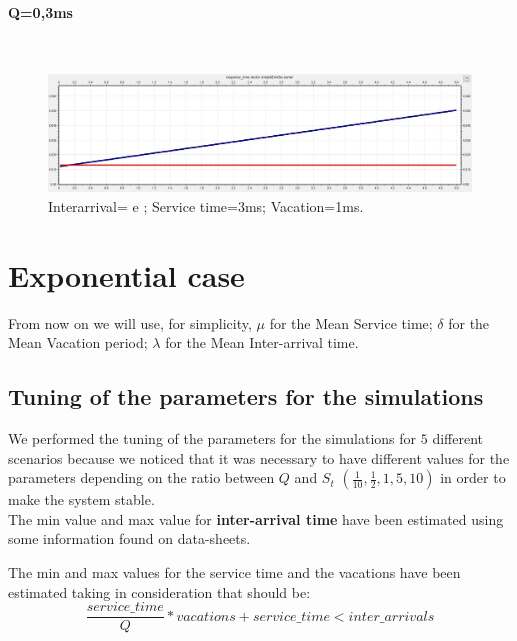 \documentclass{article}
\begin{document}
        \begin{paragraph}
        \centering
            \centering \paragraph{Q=0,3ms} \hfill \\
            \begin{figure}[htbp]
                \centering
                \includegraphics[scale=0.3]{./images/constant_case/03ms.jpg}
                \caption{Interarrival= {\color{blue}{12,9ms}} e {\color{red}{13ms}}; Service time=3ms; Vacation=1ms.}
                \label{fig:constant_03ms}
            \end{figure}
        \end{paragraph}

\newpage

\section{Exponential case}

    From now on we will use, for simplicity, $\mu$ for the Mean Service time; $\delta$ for the Mean Vacation period; $\lambda$ for the Mean Inter-arrival time.

    \subsection{Tuning of the parameters for the simulations}

        We performed the tuning of the parameters for the simulations for $5$ different scenarios because we noticed that it was necessary to have different values for the parameters depending on the ratio between $Q$ and $S_t$ $(\frac{1}{10}, \frac{1}{2}, 1, 5, 10)$ in order to make the system stable.\\ 
        
        The min value and max value for \textbf{inter-arrival time} have been estimated using some information found on data-sheets.
        
        The min and max values for the service time and the vacations have been estimated taking in consideration that should be:
        \[\frac{service\_time}{Q}*vacations + service\_time < inter\_arrivals\]
        
\end{document}
